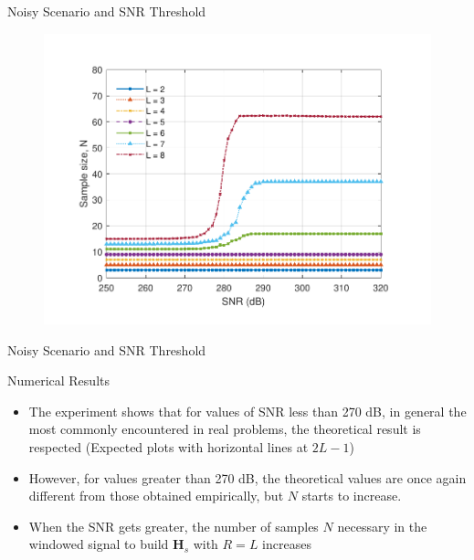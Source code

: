 \documentclass{beamer}
\begin{document}
	\begin{frame}{Noisy Scenario and SNR Threshold}
        
        \vspace{-20pt}

        \begin{figure}[!ht]
			\centering
			\includegraphics[scale=0.75]{fig/SBRT2021/SNR_proximity-MonteCarlo-with-100runs--2021-05-15.pdf}
		\end{figure}
		
	\end{frame}

	\begin{frame}{Noisy Scenario and SNR Threshold}
        
        \begin{block}{Numerical Results}
            \begin{itemize}
                \item The experiment shows that for values of SNR less than 270 dB, in general the most commonly encountered in real problems, the theoretical result is respected (Expected plots with horizontal lines at $2L - 1$)
                \item However, for values greater than 270 dB, the theoretical values are once again different from those obtained empirically, but $N$ starts to increase.
                \item When the SNR gets greater, the number of samples $N$ necessary in the windowed signal to build ${\mathbf{H}}_s$ with $R=L$ increases
        	\end{itemize}
        \end{block}

	\end{frame}
	
\end{document}
